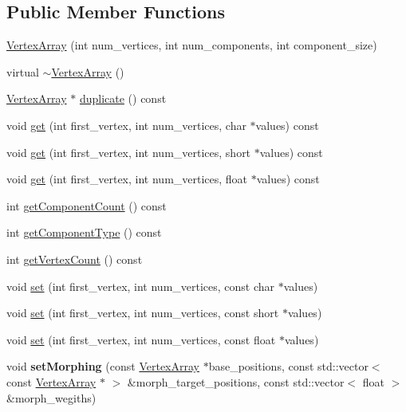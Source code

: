\subsection*{Public Member Functions}
\begin{CompactItemize}
\item 
\hyperlink{classm3g_1_1VertexArray_5f38e30d23b5dc34b223e749e8afd0d0}{VertexArray} (int num\_\-vertices, int num\_\-components, int component\_\-size)
\item 
virtual \hyperlink{classm3g_1_1VertexArray_267fa63cb2f4216729437dc826415911}{$\sim$VertexArray} ()
\item 
\hyperlink{classm3g_1_1VertexArray}{VertexArray} $\ast$ \hyperlink{classm3g_1_1VertexArray_f0dc6a5510bf837ef48129f344d666a8}{duplicate} () const 
\item 
void \hyperlink{classm3g_1_1VertexArray_9d1b801a7c196a07553a5ef4a5473573}{get} (int first\_\-vertex, int num\_\-vertices, char $\ast$values) const 
\item 
void \hyperlink{classm3g_1_1VertexArray_575822f60d7b5e74ed51e94851123038}{get} (int first\_\-vertex, int num\_\-vertices, short $\ast$values) const 
\item 
void \hyperlink{classm3g_1_1VertexArray_79b1ffd7586fe23fb5e31661e4d296e3}{get} (int first\_\-vertex, int num\_\-vertices, float $\ast$values) const 
\item 
int \hyperlink{classm3g_1_1VertexArray_7016f51d2788e78fdd736efd040f5e5e}{getComponentCount} () const 
\item 
int \hyperlink{classm3g_1_1VertexArray_9b7b78fbff0603779ec6bdd2a323c939}{getComponentType} () const 
\item 
int \hyperlink{classm3g_1_1VertexArray_c1c9b7f5b0dcd9c0310d7e77e10081ba}{getVertexCount} () const 
\item 
void \hyperlink{classm3g_1_1VertexArray_c92a86c7439c8e38c7e5b69e3eca3ee1}{set} (int first\_\-vertex, int num\_\-vertices, const char $\ast$values)
\item 
void \hyperlink{classm3g_1_1VertexArray_f417744f1798d293c85c5e7fb6e1e846}{set} (int first\_\-vertex, int num\_\-vertices, const short $\ast$values)
\item 
void \hyperlink{classm3g_1_1VertexArray_24b9d666468f856b2bf09e450b20fdfb}{set} (int first\_\-vertex, int num\_\-vertices, const float $\ast$values)
\item 
\hypertarget{classm3g_1_1VertexArray_b5b62e478fb0964ca1c168714a66e562}{
void \textbf{setMorphing} (const \hyperlink{classm3g_1_1VertexArray}{VertexArray} $\ast$base\_\-positions, const std::vector$<$ const \hyperlink{classm3g_1_1VertexArray}{VertexArray} $\ast$ $>$ \&morph\_\-target\_\-positions, const std::vector$<$ float $>$ \&morph\_\-wegiths)}
\label{classm3g_1_1VertexArray_b5b62e478fb0964ca1c168714a66e562}


\end{CompactItemize}
